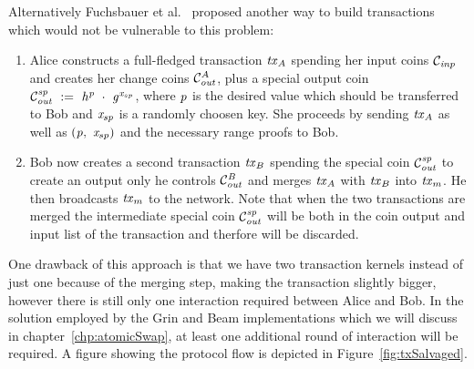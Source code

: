 Alternatively Fuchsbauer et al.~\cite{fuchsbauer2019aggregate} proposed another way to build transactions which would not be vulnerable to this problem:
\begin{enumerate}
    \item Alice constructs a full-fledged transaction $\mathit{tx}_A$ spending her input coins $\mathcal{C}_{\mathit{inp}}$ and creates her change coins $\mathcal{C}_{\mathit{out}}^A$, plus a special output coin $\mathcal{C}_{\mathit{out}}^{\mathit{sp}} ~:=~ \mathit{h}^{\mathit{p}} ~\cdot~ \mathit{g}^{\mathit{x}_{sp}}$,
    where $\mathit{p}$ is the desired value which should be transferred to Bob and $\mathit{x}_{sp}$ is a randomly choosen key. She proceeds by sending $\mathit{tx}_A$ as well as $(\mathit{p} ,~ \mathit{x}_{sp})$ and the necessary range
    proofs to Bob.
    \item Bob now creates a second transaction $\mathit{tx}_B$ spending the special coin $\mathcal{C}_{\mathit{out}}^{\mathit{sp}}$ to create an output only he controls $\mathcal{C}_{\mathit{out}}^{\mathit{B}}$ and merges $\mathit{tx}_A$ with $\mathit{tx}_B$
    into $\mathit{tx}_m$. He then broadcasts $\mathit{tx}_m$ to the network. Note that when the two transactions are merged the intermediate special coin $\mathcal{C}_{\mathit{out}}^{\mathit{sp}}$ will be both in the coin output and input list
    of the transaction and therfore will be discarded.
\end{enumerate}
One drawback of this approach is that we have two transaction kernels instead of just one because of the merging step, making the transaction slightly bigger, however there is still only one interaction required between Alice and Bob.
In the solution employed by the Grin and Beam implementations which we will discuss in chapter~\ref{chp:atomicSwap}, at least one additional round of interaction will be required.
A figure showing the protocol flow is depicted in Figure~\ref{fig:txSalvaged}.

